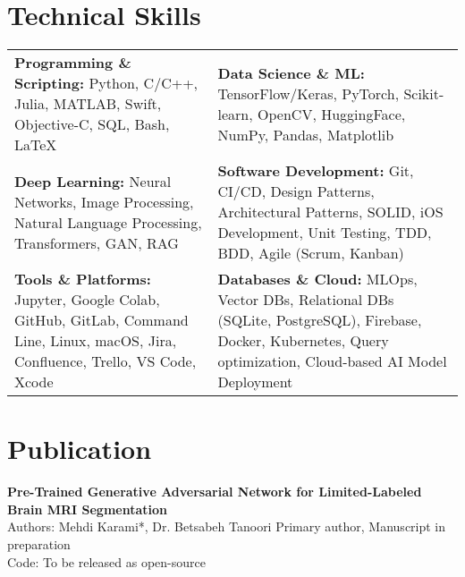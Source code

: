 \documentclass[letter,10pt]{article}
\newcommand{\customsquare}{\raisebox{0.25ex}{\scalebox{0.45}{$\blacksquare$}}}
\begin{document}
\section*{Technical Skills}
\begin{tabularx}{\textwidth}{@{}X@{\hspace{5mm}}X@{}}
\customsquare\hspace{2mm}\textbf{Programming \& Scripting:} Python, C/C++, Julia, MATLAB, Swift, Objective-C, SQL, Bash, LaTeX & 
\customsquare\hspace{2mm}\textbf{Data Science \& ML:} TensorFlow/Keras, PyTorch, Scikit-learn, OpenCV, HuggingFace, NumPy, Pandas, Matplotlib \\
\vspace{-1mm}
\customsquare\hspace{2mm}\textbf{Deep Learning:} Neural Networks, Image Processing, Natural Language Processing, Transformers, GAN, RAG &
\vspace{-1mm}
\customsquare\hspace{2mm}\textbf{Software Development:} Git, CI/CD, Design Patterns, Architectural Patterns, SOLID, iOS Development, Unit Testing, TDD, BDD, Agile (Scrum, Kanban) \\
\vspace{-1mm}
\customsquare\hspace{2mm}\textbf{Tools \& Platforms:} Jupyter, Google Colab, GitHub, GitLab, Command Line, Linux, macOS, Jira, Confluence, Trello, VS Code, Xcode &
\vspace{-1mm}
\customsquare\hspace{2mm}\textbf{Databases \& Cloud:} MLOps, Vector DBs, Relational DBs (SQLite, PostgreSQL), Firebase, Docker, Kubernetes, Query optimization, Cloud-based AI Model Deployment
\end{tabularx}

\section*{Publication}
\textbf{Pre-Trained Generative Adversarial Network for Limited-Labeled Brain MRI Segmentation} \\ [5pt]
Authors: Mehdi Karami*, Dr. Betsabeh Tanoori \hfill *Primary author, Manuscript in preparation \\
Code: To be released as open-source

\end{document}
